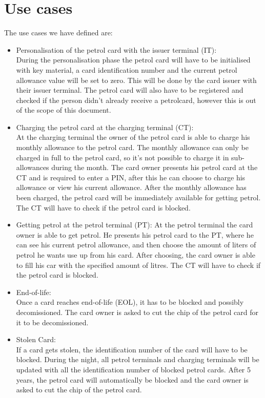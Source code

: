 
\section*{Use cases}
The use cases we have defined are:
\begin{itemize}

\item Personalisation of the petrol card with the issuer terminal (IT):\\
During the personalisation phase the petrol card will have to be initialised with key material, a card identification number and the current petrol allowance value will be set to zero. This will be done by the card issuer with their issuer terminal. The petrol card will also have to be registered and checked if the person didn't already receive a petrolcard, however this is out of the scope of this document.

\item Charging the petrol card at the charging terminal (CT): \\
At the charging terminal the owner of the petrol card is able to charge his monthly allowance to the petrol card. The monthly allowance can only be charged in full to the petrol card, so it's not possible to charge it in sub-allowances during the month. The card owner presents his petrol card at the CT and is required to enter a PIN, after this he can choose to charge his allowance or view his current allowance. After the monthly allowance has been charged, the petrol card will be immediately available for getting petrol. The CT will have to check if the petrol card is blocked.

\item Getting petrol at the petrol terminal (PT):
At the petrol terminal the card owner is able to get petrol. He presents his petrol card to the PT, where he can see his current petrol allowance, and then choose the amount of liters of petrol he wants use up from his card. After choosing, the card owner is able to fill his car with the specified amount of litres. The CT will have to check if the petrol card is blocked.

\item End-of-life: \\
Once a card reaches end-of-life (EOL), it has to be blocked and possibly decomissioned. The card owner is asked to cut the chip of the petrol card for it to be decomissioned.

\item Stolen Card: \\
If a card gets stolen, the identification number of the card will have to be blocked. During the night, all petrol terminals and charging terminals will be updated with all the identification number of blocked petrol cards. After 5 years, the petrol card will automatically be blocked and the card owner is asked to cut the chip of the petrol card.

\end{itemize}